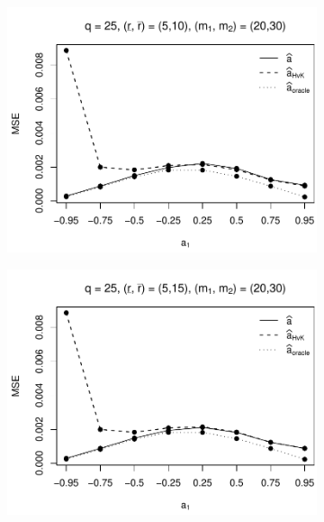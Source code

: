 \begin{figure}[p]
\begin{subfigure}[b]{0.45\textwidth}
\includegraphics[width=\textwidth]{Plots/Plots_Supplement/MSE_a_T=500_slope=1_(L1,L2,K1,K2,M1,M2)=(25,25,5,10,20,30).pdf}
\end{subfigure}
\hspace{0.25cm}
\begin{subfigure}[b]{0.45\textwidth}
\includegraphics[width=\textwidth]{Plots/Plots_Supplement/MSE_a_T=500_slope=1_(L1,L2,K1,K2,M1,M2)=(25,25,5,15,20,30).pdf}
\end{subfigure}


\end{figure}
